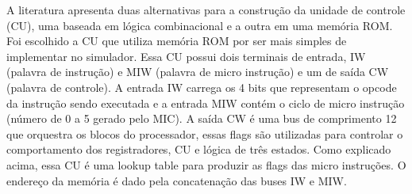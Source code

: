 

A literatura apresenta duas alternativas para a construção da unidade de controle (CU), uma baseada em lógica combinacional e a outra em uma memória ROM.
Foi escolhido a CU que utiliza memória ROM por ser mais simples de implementar no simulador.
Essa CU possui dois terminais de entrada, IW (palavra de instrução) e MIW (palavra de micro instrução) e um de saída CW (palavra de controle).
A entrada IW carrega os 4 bits que representam o opcode da instrução sendo executada e a entrada MIW contém o ciclo de micro instrução (número de 0 a 5 gerado pelo MIC).
A saída CW é uma bus de comprimento 12 que orquestra os blocos do processador, essas flags são utilizadas para controlar o comportamento dos registradores, CU e lógica de três estados.
Como explicado acima, essa CU é uma lookup table para produzir as flags das micro instruções.
O endereço da memória é dado pela concatenação das buses IW e MIW.
